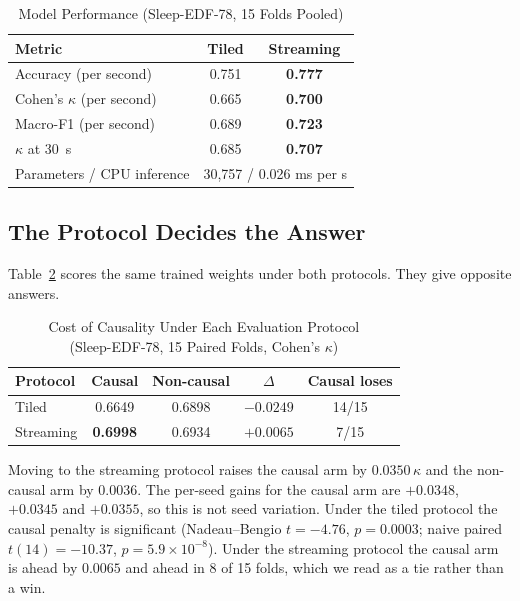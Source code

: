 \documentclass[conference]{IEEEtran}
\begin{document}
\begin{table}[t]
\caption{Model Performance (Sleep-EDF-78, 15 Folds Pooled)}
\label{tab:headline}
\centering
\begin{tabular}{lcc}
\toprule
Metric & Tiled & \textbf{Streaming} \\
\midrule
Accuracy (per second)         & 0.751 & \textbf{0.777} \\
Cohen's $\kappa$ (per second) & 0.665 & \textbf{0.700} \\
Macro-F1 (per second)         & 0.689 & \textbf{0.723} \\
$\kappa$ at 30~s              & 0.685 & \textbf{0.707} \\
\midrule
Parameters / CPU inference    & \multicolumn{2}{c}{30{,}757 / 0.026 ms per s} \\
\bottomrule
\end{tabular}
\end{table}

\subsection{The Protocol Decides the Answer}
\label{sec:matched}

Table~\ref{tab:protocol} scores the same trained weights under both protocols. They give opposite
answers.

\begin{table}[t]
\caption{Cost of Causality Under Each Evaluation Protocol\\(Sleep-EDF-78, 15 Paired Folds, Cohen's $\kappa$)}
\label{tab:protocol}
\centering
\begin{tabular}{lcccc}
\toprule
Protocol & Causal & Non-causal & $\Delta$ & Causal loses \\
\midrule
Tiled     & 0.6649 & 0.6898 & $-0.0249$ & 14/15 \\
Streaming & \textbf{0.6998} & 0.6934 & $\mathbf{+0.0065}$ & 7/15 \\
\bottomrule
\end{tabular}
\end{table}

Moving to the streaming protocol raises the causal arm by $0.0350\,\kappa$ and the non-causal arm by
$0.0036$. The per-seed gains for the causal arm are $+0.0348$, $+0.0345$ and $+0.0355$, so this is
not seed variation. Under the tiled protocol the causal penalty is significant (Nadeau--Bengio
$t = -4.76$, $p = 0.0003$; naive paired $t(14) = -10.37$, $p = 5.9\times10^{-8}$). Under the
streaming protocol the causal arm is ahead by $0.0065$ and ahead in 8 of 15 folds, which we read as
a tie rather than a win.
\end{document}
